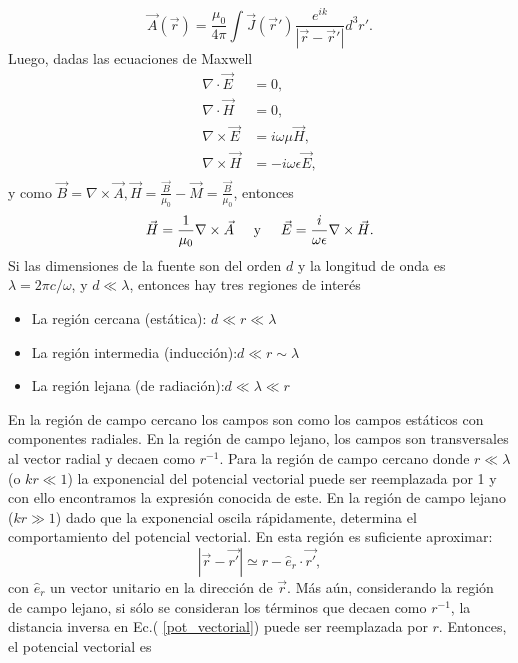 \begin{equation}
\Vec{A}(\Vec{r})=\frac{\mu_0}{4\pi}\int \Vec{J}(\Vec{r}')\frac{e^{ik}}{|\Vec{r}-\Vec{r}'|} d^3r'.
\end{equation}
Luego, dadas las ecuaciones de Maxwell
\begin{align}
    \nabla\cdot\Vec{E}&=0,\\
    \nabla\cdot\Vec{H}&=0,\\
    \nabla\times\Vec{E}&=i\omega\mu\Vec{H},\\
    \nabla\times\Vec{H}&=-i\omega\epsilon\Vec{E},\\
\end{align}
y como $\Vec{B}=\nabla\times\Vec{A}, \Vec{H}=\frac{\Vec{B}}{\mu_0}-\Vec{M}=\frac{\Vec{B}}{\mu_0}$, entonces 
\begin{equation}
    \Vec{H}=\frac{1}{\mu_0}\nabla\times\Vec{A}\hspace{0.5cm}\mbox{y}\hspace{0.5cm}    \Vec{E}=\frac{i}{\omega\epsilon}\nabla\times\Vec{H}.
\end{equation}
Si las dimensiones de la fuente son del orden $d$ y la longitud de onda es $\lambda=2\pi c/\omega$, y $d\ll\lambda$, entonces hay tres regiones de interés \cite{Jackson}
\begin{itemize}
    \item La región cercana (estática): \hspace{2.4cm}$d\ll r\ll\lambda$
    \item La región intermedia (inducción):\hspace{1.7cm}$d\ll r\sim \lambda$
    \item La región lejana (de radiación):\hspace{2cm}$d\ll \lambda\ll r$
\end{itemize}
En la región de campo cercano los campos son como los campos estáticos con componentes radiales. En la región de campo lejano, los campos son transversales al vector radial y decaen como $r^{-1}$. 
Para la región de campo cercano donde $r\ll\lambda$ (o $kr\ll 1$) la exponencial del potencial vectorial puede ser reemplazada por 1 y con ello encontramos la expresión conocida de este.
En la región de campo lejano ($kr\gg 1$) dado que la exponencial oscila rápidamente, determina el comportamiento del potencial vectorial. En esta región es suficiente aproximar:
\begin{equation}
    |\Vec{r}-\Vec{r'}|\simeq r-\hat{e}_r\cdot\Vec{r'},    
\end{equation}
con $\hat{e}_r$ un vector unitario en la dirección de $\Vec{r}$. Más aún, considerando la región de campo lejano, si sólo se consideran los términos que decaen como $r^{-1}$, la distancia inversa en Ec.( \ref{pot_vectorial}) puede ser reemplazada por $r$. Entonces, el potencial vectorial es
